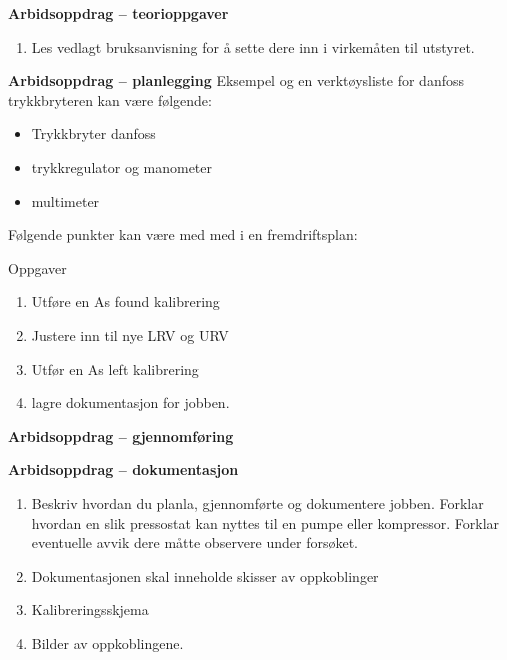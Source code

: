 \textbf{Arbidsoppdrag -- teorioppgaver}

\begin{enumerate}
	\item Les vedlagt bruksanvisning for å sette dere inn i virkemåten til utstyret.
\end{enumerate}
\textbf{Arbidsoppdrag -- planlegging}
Eksempel og en verktøysliste for danfoss trykkbryteren kan være følgende:

\vskip 5pt 
\begin{itemize}[noitemsep]
	\item Trykkbryter danfoss
	\item trykkregulator og manometer
	\item multimeter
\end{itemize}

Følgende punkter kan være med med i en fremdriftsplan:

Oppgaver\begin{enumerate}
	\item Utføre en As found kalibrering 
	\item Justere inn til nye LRV og URV
	\item Utfør en As left kalibrering 
	\item lagre dokumentasjon for jobben.
\end{enumerate}
\textbf{Arbidsoppdrag -- gjennomføring}

\textbf{Arbidsoppdrag -- dokumentasjon}

\begin{enumerate}
	\item Beskriv hvordan du planla, gjennomførte og dokumentere jobben. Forklar hvordan en slik pressostat kan nyttes til en pumpe eller kompressor. Forklar eventuelle avvik dere måtte observere under forsøket. 
	\item Dokumentasjonen skal inneholde skisser av oppkoblinger 
	\item Kalibreringsskjema
	\item Bilder av oppkoblingene. 
\end{enumerate}




\noindent

\vfil \eject

















